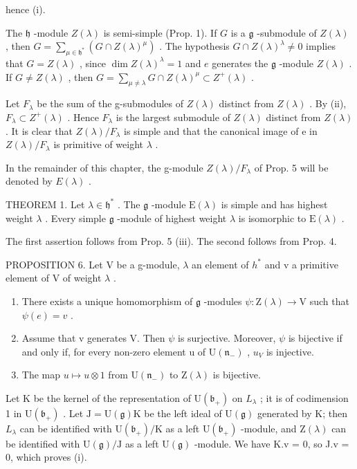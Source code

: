 hence (i).

The \(\mathfrak{h}\) -module \(Z(\lambda)\) is semi-simple (Prop. 1). If \(G\) is a \(\mathfrak{g}\) -submodule of \(Z(\lambda)\) , then \(G = \sum_{\mu \in \mathfrak{h}^*}(G \cap Z(\lambda)^\mu)\) . The hypothesis \(G \cap Z(\lambda)^\lambda \neq 0\) implies that \(G = Z(\lambda)\) , since \(\dim Z(\lambda)^\lambda = 1\) and \(e\) generates the \(\mathfrak{g}\) -module \(Z(\lambda)\) . If \(G \neq Z(\lambda)\) , then \(G = \sum_{\mu \neq \lambda} G \cap Z(\lambda)^\mu \subset Z^+( \lambda)\) .

Let \(F_{\lambda}\) be the sum of the g-submodules of \(Z(\lambda)\) distinct from \(Z(\lambda)\) . By (ii), \(F_{\lambda} \subset Z^{+}(\lambda)\) . Hence \(F_{\lambda}\) is the largest submodule of \(Z(\lambda)\) distinct from \(Z(\lambda)\) . It is clear that \(Z(\lambda)/F_{\lambda}\) is simple and that the canonical image of e in \(Z(\lambda)/F_{\lambda}\) is primitive of weight \(\lambda\) .

In the remainder of this chapter, the g-module \(Z(\lambda)/F_{\lambda}\) of Prop. 5 will be denoted by \(E(\lambda)\) .

THEOREM 1. Let \(\lambda \in \mathfrak{h}^*\) . The \(\mathfrak{g}\) -module \(\mathrm{E}(\lambda)\) is simple and has highest weight \(\lambda\) . Every simple \(\mathfrak{g}\) -module of highest weight \(\lambda\) is isomorphic to \(\mathrm{E}(\lambda)\) .

The first assertion follows from Prop. 5 (iii). The second follows from Prop. 4.

PROPOSITION 6. Let V be a g-module, \(\lambda\) an element of \(h^{*}\) and v a primitive element of V of weight \(\lambda\) .

\begin{enumerate}
\def\labelenumi{(\roman{enumi})}
\item
  There exists a unique homomorphism of \(\mathfrak{g}\) -modules \(\psi: \mathrm{Z}(\lambda) \to \mathrm{V}\) such that \(\psi(e) = v\) .
\item
  Assume that v generates V. Then \(\psi\) is surjective. Moreover, \(\psi\) is bijective if and only if, for every non-zero element u of \(\mathrm{U}(\mathfrak{n}_{-})\) , \(u_{V}\) is injective.
\item
  The map \(u \mapsto u \otimes 1\) from \(\mathrm{U}(\mathfrak{n}_{-})\) to \(\mathrm{Z}(\lambda)\) is bijective.
\end{enumerate}

Let K be the kernel of the representation of \(\mathrm{U}(\mathfrak{b}_{+})\) on \(L_{\lambda}\) ; it is of codimension 1 in \(\mathrm{U}(\mathfrak{b}_{+})\) . Let \(\mathrm{J} = \mathrm{U}(\mathfrak{g})\mathrm{K}\) be the left ideal of \(\mathrm{U}(\mathfrak{g})\) generated by K; then \(L_{\lambda}\) can be identified with \(\mathrm{U}(\mathfrak{b}_{+})/\mathrm{K}\) as a left \(\mathrm{U}(\mathfrak{b}_{+})\) -module, and \(\mathrm{Z}(\lambda)\) can be identified with \(\mathrm{U}(\mathfrak{g})/\mathrm{J}\) as a left \(\mathrm{U}(\mathfrak{g})\) -module. We have K.v = 0, so J.v = 0, which proves (i).

